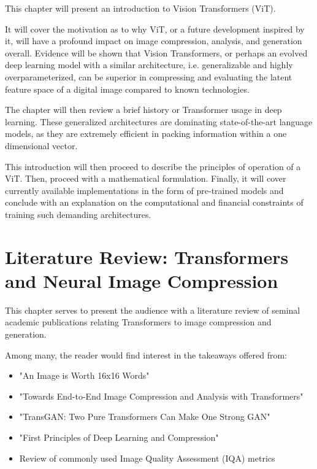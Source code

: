 \documentclass[pdftex,11pt,titlepage,twoside,openright]{report}
\begin{document}
This chapter will present an introduction to Vision Transformers (ViT).

It will cover the motivation as to why ViT, or a future development inspired by it,
will have a profound impact on image compression, analysis, and generation overall.
Evidence will be shown that Vision Transformers, or perhaps an evolved deep learning model with a
similar architecture, i.e. generalizable and highly overparameterized, can be superior in
compressing and evaluating the latent feature space of a digital image compared to known
technologies.

The chapter will then review a brief history or Transformer usage in deep learning.
These generalized architectures are dominating state-of-the-art language models,
as they are extremely efficient in packing information within a one dimensional vector.

This introduction will then proceed to describe the principles of operation of a ViT. Then, proceed with
a mathematical formulation. Finally, it will cover currently available implementations
in the form of pre-trained models and conclude with an explanation on the computational and
financial constraints of training such demanding architectures.

\ThinHRule

\newpage



\cleardoublepage
\chapter{Literature Review: Transformers and Neural Image Compression}


This chapter serves to present the audience with a literature review of seminal academic
publications relating Transformers to image compression and generation.

Among many, the reader would find interest in the takeaways offered from:

\begin{itemize}
	\item "An Image is Worth 16x16 Words" \citep{dosovitskiy2020vit}
	\item "Towards End-to-End Image Compression and Analysis with Transformers" 
    
    \citep{Bai2022AAAI}
	\item "TransGAN: Two Pure Transformers Can Make One Strong GAN" \citep{jiang2021transgan}
	\item "First Principles of Deep Learning and Compression" \citep{Principles}
	\item Review of commonly used Image Quality Assessment (IQA) metrics \citep{BRISQUE}
    
    \citep{Metrics}
\end{itemize}
\end{document}
